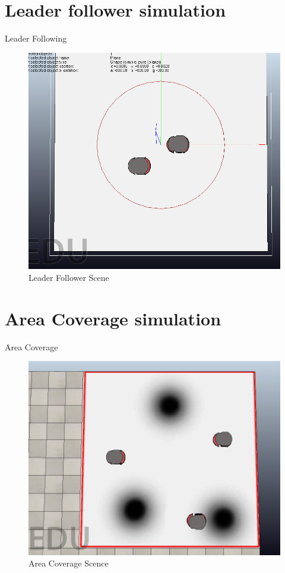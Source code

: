 \documentclass{beamer}
\begin{document}
\section{Leader follower simulation}
\begin{frame}{Leader Following}
\begin{center}
\begin{figure}
\includegraphics[scale=0.25]{figs/img/leader.png}
\caption{Leader Follower Scene}
\end{figure}
\end{center}

\end{frame}
\section{Area Coverage simulation}
\begin{frame}{Area Coverage}
\begin{center}
\begin{figure}
\includegraphics[scale=0.25]{figs/img/area.png}
\caption{Area Coverage Scence}
\end{figure}
\end{center}


\end{frame}
\end{document}
